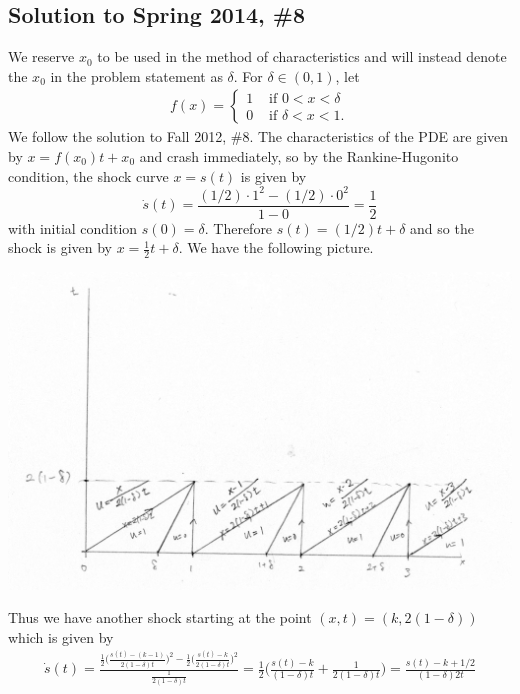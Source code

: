 \subsection*{Solution to Spring 2014, \#8}\label{s148}
We reserve $x_{0}$ to be used in the method of characteristics and will instead denote the $x_{0}$ in the problem statement as $\delta$.
For $\delta \in (0, 1)$, let
\begin{align*}
f(x) =
\begin{cases}
1 & \text{ if } 0 < x < \delta\\
0 & \text{ if } \delta < x < 1.
\end{cases}
\end{align*}
We follow the solution to Fall 2012, \#8. The characteristics of the PDE are given by $x = f(x_{0})t + x_{0}$ and crash immediately, so by the Rankine-Hugonito condition, the
shock curve $x = s(t)$ is given by
$$\dot{s}(t) = \frac{(1/2)\cdot 1^{2} - (1/2)\cdot 0^{2}}{1 - 0} = \frac{1}{2}$$
with initial condition $s(0) = \delta$. Therefore $s(t) = (1/2)t + \delta$ and so the shock is given by $x = \frac{1}{2}t +\delta$. We have the following picture.
\begin{center}
\includegraphics[scale = 0.35]{./_Figures/S14Q8a.png}
\end{center}
Thus we have another shock starting at the point $(x, t) = (k, 2(1 - \delta))$ which is given by
\begin{align*}
\dot{s}(t) = \frac{\frac{1}{2}\bigg(\frac{s(t) - (k - 1)}{2(1 - \delta)t}\bigg)^{2} - \frac{1}{2}\bigg(\frac{s(t) - k}{2(1 - \delta)t}\bigg)^{2}}{\frac{1}{2(1 - \delta)t}} = \frac{1}{2}\bigg(\frac{s(t) - k}{(1 - \delta)t} + \frac{1}{2(1 - \delta)t}\bigg) = \frac{s(t) - k + 1/2}{(1 - \delta)2t}
\end{align*}
